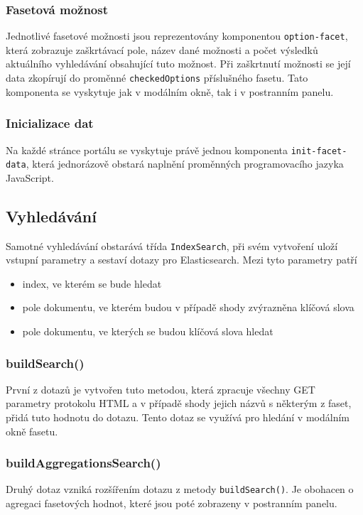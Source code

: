 \subsubsection*{Fasetová možnost}
Jednotlivé fasetové možnosti jsou reprezentovány komponentou \texttt{option-facet}, která zobrazuje zaškrtávací pole, název dané možnosti a počet výsledků aktuálního vyhledávání obsahující tuto možnost. Při zaškrtnutí možnosti se její data zkopírují do proměnné \texttt{checkedOptions} příslušného fasetu. Tato komponenta se vyskytuje jak v modálním okně, tak i v postranním panelu.

\subsubsection*{Inicializace dat}
Na každé stránce portálu se vyskytuje právě jednou komponenta \texttt{init-facet-data}, která jednorázově obstará naplnění proměnných programovacího jazyka JavaScript.

\subsection{Vyhledávání}
Samotné vyhledávání obstarává třída \texttt{IndexSearch}, při svém vytvoření uloží vstupní parametry a sestaví dotazy pro Elasticsearch. Mezi tyto parametry patří
\begin{itemize}
    \item index, ve kterém se bude hledat
    \item pole dokumentu, ve kterém budou v případě shody zvýrazněna klíčová slova
    \item pole dokumentu, ve kterých se budou klíčová slova hledat
\end{itemize}
\subsubsection*{buildSearch()}
První z dotazů je vytvořen tuto metodou, která zpracuje všechny GET parametry protokolu HTML a v případě shody jejich názvů s některým z faset, přidá tuto hodnotu do dotazu. Tento dotaz se využívá pro hledání v modálním okně fasetu. 

\subsubsection*{buildAggregationsSearch()}
Druhý dotaz vzniká rozšířením dotazu z metody \texttt{buildSearch()}. Je obohacen o agregaci fasetových hodnot, které jsou poté zobrazeny v postranním panelu.

